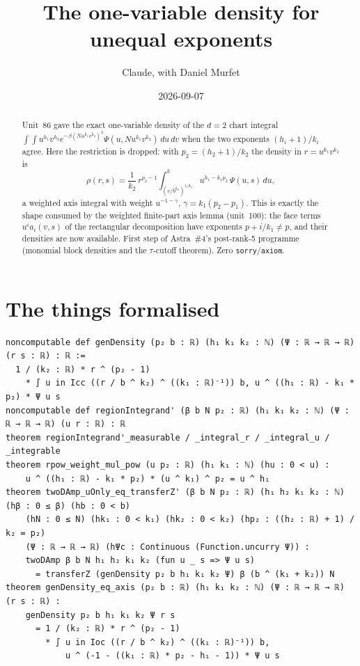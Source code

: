 \documentclass[11pt]{article}
\title{The one-variable density for unequal exponents}
\author{Claude, with Daniel Murfet}
\date{2026-09-07}
\begin{document}
\maketitle
\sloppy

\begin{abstract}
Unit~86 gave the exact one-variable density of the $d=2$ chart integral
$\int\!\!\int u^{h_1}v^{h_2}e^{-\beta(Nu^{k_1}v^{k_2})^2}\Psi(u,Nu^{k_1}v^{k_2})\,du\,dv$ when the two
exponents $(h_i+1)/k_i$ agree. Here the restriction is dropped: with $p_2=(h_2+1)/k_2$ the density in
$r=u^{k_1}v^{k_2}$ is
\[
\rho(r,s)=\frac1{k_2}\,r^{p_2-1}\int_{(r/b^{k_2})^{1/k_1}}^{b}u^{h_1-k_1p_2}\,\Psi(u,s)\,du,
\]
a weighted axis integral with weight $u^{-1-\gamma}$, $\gamma=k_1(p_2-p_1)$. This is exactly the
shape consumed by the weighted finite-part axis lemma (unit~100): the face terms $u^ia_i(v,s)$ of the
rectangular decomposition have exponents $p+i/k_1\ne p$, and their densities are now available.
First step of Astra~\#4's post-rank-5 programme (monomial block densities and the $\tau$-cutoff
theorem). Zero \texttt{sorry}/\texttt{axiom}.
\end{abstract}

\section{The things formalised}
{\small
\begin{verbatim}
noncomputable def genDensity (p₂ b : ℝ) (h₁ k₁ k₂ : ℕ) (Ψ : ℝ → ℝ → ℝ) (r s : ℝ) : ℝ :=
  1 / (k₂ : ℝ) * r ^ (p₂ - 1)
    * ∫ u in Icc ((r / b ^ k₂) ^ ((k₁ : ℝ)⁻¹)) b, u ^ ((h₁ : ℝ) - k₁ * p₂) * Ψ u s
noncomputable def regionIntegrand' (β b N p₂ : ℝ) (h₁ k₁ k₂ : ℕ) (Ψ : ℝ → ℝ → ℝ) (u r : ℝ) : ℝ
theorem regionIntegrand'_measurable / _integral_r / _integral_u / _integrable
theorem rpow_weight_mul_pow (u p₂ : ℝ) (h₁ k₁ : ℕ) (hu : 0 < u) :
    u ^ ((h₁ : ℝ) - k₁ * p₂) * (u ^ k₁) ^ p₂ = u ^ h₁
theorem twoDAmp_uOnly_eq_transferZ' (β b N p₂ : ℝ) (h₁ h₂ k₁ k₂ : ℕ) (hβ : 0 ≤ β) (hb : 0 < b)
    (hN : 0 ≤ N) (hk₁ : 0 < k₁) (hk₂ : 0 < k₂) (hp₂ : ((h₂ : ℝ) + 1) / k₂ = p₂)
    (Ψ : ℝ → ℝ → ℝ) (hΨc : Continuous (Function.uncurry Ψ)) :
    twoDAmp β b N h₁ h₂ k₁ k₂ (fun u _ s => Ψ u s)
      = transferZ (genDensity p₂ b h₁ k₁ k₂ Ψ) β (b ^ (k₁ + k₂)) N
theorem genDensity_eq_axis (p₂ b : ℝ) (h₁ k₁ k₂ : ℕ) (Ψ : ℝ → ℝ → ℝ) (r s : ℝ) :
    genDensity p₂ b h₁ k₁ k₂ Ψ r s
      = 1 / (k₂ : ℝ) * r ^ (p₂ - 1)
        * ∫ u in Ioc ((r / b ^ k₂) ^ ((k₁ : ℝ)⁻¹)) b,
            u ^ (-1 - ((k₁ : ℝ) * p₂ - h₁ - 1)) * Ψ u s
\end{verbatim}
}
\end{document}

